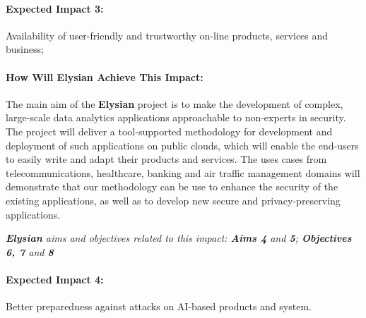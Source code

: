 \documentclass[a4paper,11pt]{article}
\newcommand{\project}[1]{\textbf{#1}\xspace}
\newcommand{\SECURITY}{\project{Elysian}}
\newcommand{\TheProject}{\SECURITY}
\begin{document}
\begin{mdframed}[backgroundcolor=blue!5]
\paragraph{Expected Impact 3:}
Availability of user-friendly and trustworthy on-line products, services and business;
\end{mdframed}

\begin{mdframed}[backgroundcolor=gray!10]
\paragraph{How Will \TheProject{} Achieve This Impact:}
The main aim of the \TheProject{} project is to make the development of complex, large-scale data analytics applications approachable to non-experts in security. The project will deliver a tool-supported methodology for development and deployment of such applications on public clouds, which will enable the end-users to easily write and adapt their products and services. The uses cases from telecommunications, healthcare, banking and air traffic management domains will demonstrate that our methodology can be use to enhance the security of the existing applications, as well as to develop new secure and privacy-preserving applications.

\emph{\TheProject{} aims and objectives related to this impact: \textbf{Aims 4}  and \textbf{5}; \textbf{Objectives 6, 7} and \textbf{8} }

\end{mdframed}

\begin{mdframed}[backgroundcolor=blue!5]
\paragraph{Expected Impact 4:}
Better preparedness against attacks on AI-based products and system.
\end{mdframed}
\end{document}
